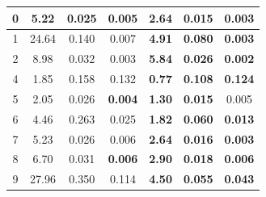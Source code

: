 \begin{table}[t]
\begin{tabular}{|ccccccc|}
\multicolumn{1}{|c|}{0}          & \multicolumn{1}{c|}{5.22}        & \multicolumn{1}{c|}{0.025}            & \multicolumn{1}{c|}{0.005}                & \multicolumn{1}{c|}{\textbf{2.64}}  & \multicolumn{1}{c|}{\textbf{0.015}} & \textbf{0.003}              \\ \hline
\multicolumn{1}{|c|}{1}          & \multicolumn{1}{c|}{24.64}       & \multicolumn{1}{c|}{0.140}            & \multicolumn{1}{c|}{0.007}                & \multicolumn{1}{c|}{\textbf{4.91}}  & \multicolumn{1}{c|}{\textbf{0.080}} & \textbf{0.003}              \\ \hline
\multicolumn{1}{|c|}{2}          & \multicolumn{1}{c|}{8.98}        & \multicolumn{1}{c|}{0.032}            & \multicolumn{1}{c|}{0.003}                & \multicolumn{1}{c|}{\textbf{5.84}}  & \multicolumn{1}{c|}{\textbf{0.026}} & \textbf{0.002}              \\ \hline
\multicolumn{1}{|c|}{4}          & \multicolumn{1}{c|}{1.85}        & \multicolumn{1}{c|}{0.158}            & \multicolumn{1}{c|}{0.132}                & \multicolumn{1}{c|}{\textbf{0.77}}  & \multicolumn{1}{c|}{\textbf{0.108}} & \textbf{0.124}              \\ \hline
\multicolumn{1}{|c|}{5}          & \multicolumn{1}{c|}{2.05}        & \multicolumn{1}{c|}{0.026}            & \multicolumn{1}{c|}{\textbf{0.004}}       & \multicolumn{1}{c|}{\textbf{1.30}}  & \multicolumn{1}{c|}{\textbf{0.015}} & 0.005                       \\ \hline
\multicolumn{1}{|c|}{6}          & \multicolumn{1}{c|}{4.46}        & \multicolumn{1}{c|}{0.263}            & \multicolumn{1}{c|}{0.025}       & \multicolumn{1}{c|}{\textbf{1.82}}  & \multicolumn{1}{c|}{\textbf{0.060}} & \textbf{0.013}                       \\ \hline
\multicolumn{1}{|c|}{7}          & \multicolumn{1}{c|}{5.23}        & \multicolumn{1}{c|}{0.026}            & \multicolumn{1}{c|}{0.006}                & \multicolumn{1}{c|}{\textbf{2.64}}  & \multicolumn{1}{c|}{\textbf{0.016}} & \textbf{0.003}              \\ \hline
\multicolumn{1}{|c|}{8}          & \multicolumn{1}{c|}{6.70}        & \multicolumn{1}{c|}{0.031}            & \multicolumn{1}{c|}{\textbf{0.006}}       & \multicolumn{1}{c|}{\textbf{2.90}}  & \multicolumn{1}{c|}{\textbf{0.018}} & \textbf{0.006}              \\ \hline
\multicolumn{1}{|c|}{9}          & \multicolumn{1}{c|}{27.96}        & \multicolumn{1}{c|}{0.350}            & \multicolumn{1}{c|}{0.114}                & \multicolumn{1}{c|}{\textbf{4.50}}  & \multicolumn{1}{c|}{\textbf{0.055}} & \textbf{0.043}              \\ \hline

\end{tabular}
\end{table}
